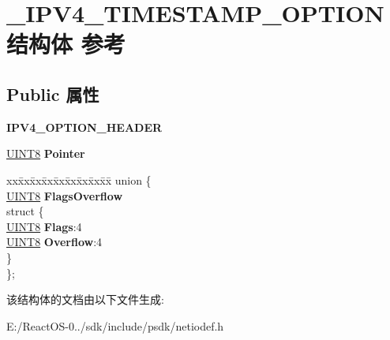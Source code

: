 \hypertarget{struct___i_p_v4___t_i_m_e_s_t_a_m_p___o_p_t_i_o_n}{}\section{\+\_\+\+I\+P\+V4\+\_\+\+T\+I\+M\+E\+S\+T\+A\+M\+P\+\_\+\+O\+P\+T\+I\+O\+N结构体 参考}
\label{struct___i_p_v4___t_i_m_e_s_t_a_m_p___o_p_t_i_o_n}
\subsection*{Public 属性}
\begin{DoxyCompactItemize}
\item 
\mbox{\label{struct___i_p_v4___t_i_m_e_s_t_a_m_p___o_p_t_i_o_n_a7696923166fd6c020a743db3995e3511}} 
{\bfseries I\+P\+V4\+\_\+\+O\+P\+T\+I\+O\+N\+\_\+\+H\+E\+A\+D\+ER}
\item 
\mbox{\label{struct___i_p_v4___t_i_m_e_s_t_a_m_p___o_p_t_i_o_n_a37835ddcca616fa0689a5605343bf8b5}} 
\hyperlink{_processor_bind_8h_ab27e9918b538ce9d8ca692479b375b6a}{U\+I\+N\+T8} {\bfseries Pointer}
\item 
\mbox{\label{struct___i_p_v4___t_i_m_e_s_t_a_m_p___o_p_t_i_o_n_a944aec42cf843355f7c1f392036635f1}} 
\begin{tabbing}
xx\=xx\=xx\=xx\=xx\=xx\=xx\=xx\=xx\=\kill
union \{\\
\>\hyperlink{_processor_bind_8h_ab27e9918b538ce9d8ca692479b375b6a}{UINT8} {\bfseries FlagsOverflow}\\
\mbox{\label{union___i_p_v4___t_i_m_e_s_t_a_m_p___o_p_t_i_o_n_1_1_0D2643_afe2a027a1a9c2d45faa2e94452be677e}} 
\>struct \{\\
\>\>\hyperlink{_processor_bind_8h_ab27e9918b538ce9d8ca692479b375b6a}{UINT8} {\bfseries Flags}:4\\
\>\>\hyperlink{_processor_bind_8h_ab27e9918b538ce9d8ca692479b375b6a}{UINT8} {\bfseries Overflow}:4\\
\>\} \\
\}; \\

\end{tabbing}\end{DoxyCompactItemize}


该结构体的文档由以下文件生成\+:\begin{DoxyCompactItemize}
\item 
E\+:/\+React\+O\+S-\/0../sdk/include/psdk/netiodef.\+h\end{DoxyCompactItemize}

